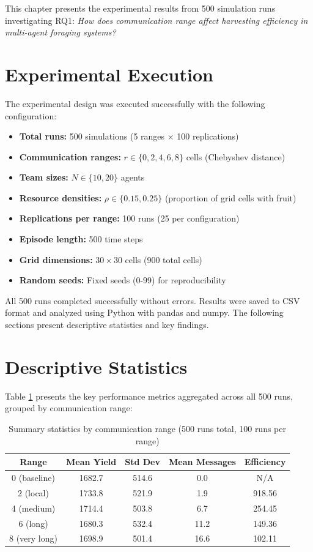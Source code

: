 
This chapter presents the experimental results from 500 simulation runs investigating RQ1: \emph{How does communication range affect harvesting efficiency in multi-agent foraging systems?}

\section{Experimental Execution}

The experimental design was executed successfully with the following configuration:

\begin{itemize}
    \item \textbf{Total runs:} 500 simulations (5 ranges × 100 replications)
    \item \textbf{Communication ranges:} $r \in \{0, 2, 4, 6, 8\}$ cells (Chebyshev distance)
    \item \textbf{Team sizes:} $N \in \{10, 20\}$ agents
    \item \textbf{Resource densities:} $\rho \in \{0.15, 0.25\}$ (proportion of grid cells with fruit)
    \item \textbf{Replications per range:} 100 runs (25 per configuration)
    \item \textbf{Episode length:} 500 time steps
    \item \textbf{Grid dimensions:} $30 \times 30$ cells (900 total cells)
    \item \textbf{Random seeds:} Fixed seeds (0-99) for reproducibility
\end{itemize}

All 500 runs completed successfully without errors. Results were saved to CSV format and analyzed using Python with pandas and numpy. The following sections present descriptive statistics and key findings.

\section{Descriptive Statistics}

Table \ref{tab:summary_stats} presents the key performance metrics aggregated across all 500 runs, grouped by communication range:

\begin{table}[h]
\centering
\small
\caption{Summary statistics by communication range (500 runs total, 100 runs per range)}
\label{tab:summary_stats}
\begin{tabular}{|c|c|c|c|c|}
\hline
\textbf{Range} & \textbf{Mean Yield} & \textbf{Std Dev} & \textbf{Mean Messages} & \textbf{Efficiency} \\
\hline
0 (baseline) & 1682.7 & 514.6 & 0.0 & N/A \\
2 (local) & 1733.8 & 521.9 & 1.9 & 918.56 \\
4 (medium) & 1714.4 & 503.8 & 6.7 & 254.45 \\
6 (long) & 1680.3 & 532.4 & 11.2 & 149.36 \\
8 (very long) & 1698.9 & 501.4 & 16.6 & 102.11 \\
\hline
\end{tabular}
\end{table}

